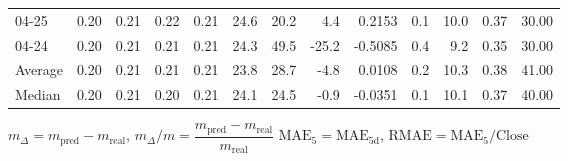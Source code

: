 \begin{threeparttable}
{\begin{tabular}{lrrrrrrrrrrrr}
  04-25 &          0.20 &          0.21 &          0.22 &        0.21 &                24.6 &                20.2 &        4.4 &       0.2153 &                 0.1 &             10.0 &            0.37 &                  30.00 \\
  04-24 &          0.20 &          0.21 &          0.21 &        0.21 &                24.3 &                49.5 &      -25.2 &      -0.5085 &                 0.4 &              9.2 &            0.35 &                  30.00 \\
Average &          0.20 &          0.21 &          0.21 &        0.21 &                23.8 &                28.7 &       -4.8 &       0.0108 &                 0.2 &             10.3 &            0.38 &                  41.00 \\
 Median &          0.20 &          0.21 &          0.20 &        0.21 &                24.1 &                24.5 &       -0.9 &      -0.0351 &                 0.1 &             10.1 &            0.37 &                  40.00 \\
\bottomrule
\end{tabular}
}
\begin{tablenotes}\footnotesize
\item $m_\Delta=m_{\text{pred}}-m_{\text{real}}$,
$m_\Delta/m=\dfrac{m_{\text{pred}}-m_{\text{real}}}{m_{\text{real}}}$
$\mathrm{MAE}_5=\mathrm{MAE}_{5\text{d}}$,
$\mathrm{RMAE}=\mathrm{MAE}_5/\text{Close}$
\end{tablenotes}
\end{threeparttable}
\endgroup

